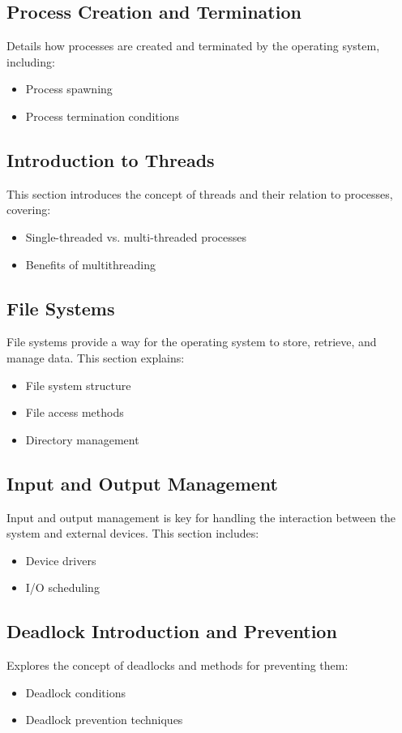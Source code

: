 \documentclass[12pt]{article}
\begin{document}
\subsection{Process Creation and Termination}
Details how processes are created and terminated by the operating system, including:
\begin{itemize}
    \item Process spawning
    \item Process termination conditions
\end{itemize}

\subsection{Introduction to Threads}
This section introduces the concept of threads and their relation to processes, covering:
\begin{itemize}
    \item Single-threaded vs. multi-threaded processes
    \item Benefits of multithreading
\end{itemize}

\subsection{File Systems}
File systems provide a way for the operating system to store, retrieve, and manage data. This section explains:
\begin{itemize}
    \item File system structure
    \item File access methods
    \item Directory management
\end{itemize}

\subsection{Input and Output Management}
Input and output management is key for handling the interaction between the system and external devices. This section includes:
\begin{itemize}
    \item Device drivers
    \item I/O scheduling
\end{itemize}

\subsection{Deadlock Introduction and Prevention}
Explores the concept of deadlocks and methods for preventing them:
\begin{itemize}
    \item Deadlock conditions
    \item Deadlock prevention techniques
\end{itemize}
\end{document}
